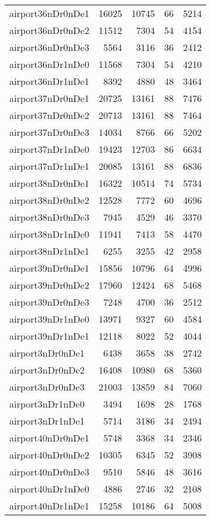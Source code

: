 \begin{longtable}{lrrrr}
airport36nDr0nDe1 & 16025 & 10745 & 66 & 5214 \\
airport36nDr0nDe2 & 11512 & 7304 & 54 & 4154 \\
airport36nDr0nDe3 & 5564 & 3116 & 36 & 2412 \\
airport36nDr1nDe0 & 11568 & 7304 & 54 & 4210 \\
airport36nDr1nDe1 & 8392 & 4880 & 48 & 3464 \\
airport37nDr0nDe1 & 20725 & 13161 & 88 & 7476 \\
airport37nDr0nDe2 & 20713 & 13161 & 88 & 7464 \\
airport37nDr0nDe3 & 14034 & 8766 & 66 & 5202 \\
airport37nDr1nDe0 & 19423 & 12703 & 86 & 6634 \\
airport37nDr1nDe1 & 20085 & 13161 & 88 & 6836 \\
airport38nDr0nDe1 & 16322 & 10514 & 74 & 5734 \\
airport38nDr0nDe2 & 12528 & 7772 & 60 & 4696 \\
airport38nDr0nDe3 & 7945 & 4529 & 46 & 3370 \\
airport38nDr1nDe0 & 11941 & 7413 & 58 & 4470 \\
airport38nDr1nDe1 & 6255 & 3255 & 42 & 2958 \\
airport39nDr0nDe1 & 15856 & 10796 & 64 & 4996 \\
airport39nDr0nDe2 & 17960 & 12424 & 68 & 5468 \\
airport39nDr0nDe3 & 7248 & 4700 & 36 & 2512 \\
airport39nDr1nDe0 & 13971 & 9327 & 60 & 4584 \\
airport39nDr1nDe1 & 12118 & 8022 & 52 & 4044 \\
airport3nDr0nDe1 & 6438 & 3658 & 38 & 2742 \\
airport3nDr0nDe2 & 16408 & 10980 & 68 & 5360 \\
airport3nDr0nDe3 & 21003 & 13859 & 84 & 7060 \\
airport3nDr1nDe0 & 3494 & 1698 & 28 & 1768 \\
airport3nDr1nDe1 & 5714 & 3186 & 34 & 2494 \\
airport40nDr0nDe1 & 5748 & 3368 & 34 & 2346 \\
airport40nDr0nDe2 & 10305 & 6345 & 52 & 3908 \\
airport40nDr0nDe3 & 9510 & 5846 & 48 & 3616 \\
airport40nDr1nDe0 & 4886 & 2746 & 32 & 2108 \\
airport40nDr1nDe1 & 15258 & 10186 & 64 & 5008 \\

\end{longtable}
